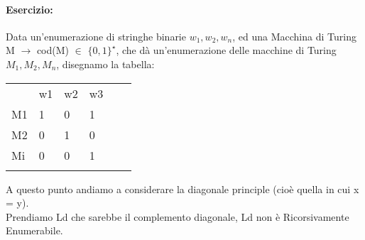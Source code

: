 \documentclass[12pt, a4paper, openany, oneside]{book}
\begin{document}
\paragraph{Esercizio: }Data un'enumerazione di stringhe binarie $w_{1}, w_{2}, w_{n}$,
ed una Macchina di Turing M $\to$ cod(M) $\in$ $\{0,1\}^{\star}$, che dà un'enumerazione
delle macchine di Turing $M_{1}, M_{2}, M_{n}$, disegnamo la tabella:
\begin{table}[]
\begin{tabular}{llllll}
                        & w1                     & w2                     & w3                     &  &  \\ \cline{2-4}
\multicolumn{1}{l|}{M1} & \multicolumn{1}{l|}{1} & \multicolumn{1}{l|}{0} & \multicolumn{1}{l|}{1} &  &  \\ \cline{2-4}
\multicolumn{1}{l|}{M2} & \multicolumn{1}{l|}{0} & \multicolumn{1}{l|}{1} & \multicolumn{1}{l|}{0} &  &  \\ \cline{2-4}
\multicolumn{1}{l|}{Mi} & \multicolumn{1}{l|}{0} & \multicolumn{1}{l|}{0} & \multicolumn{1}{l|}{1} &  &  \\ \cline{2-4}
                        &                        &                        &                        &  & 
\end{tabular}
\end{table}

A questo punto andiamo a considerare la diagonale principle (cioè quella in cui
x = y). \\
Prendiamo Ld che sarebbe il complemento diagonale, Ld non è Ricorsivamente 
Enumerabile.
\end{document}
